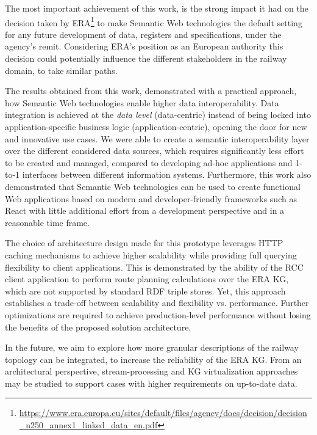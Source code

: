 The most important achievement of this work,
is the strong impact it had on the decision taken by ERA\footnote{\url{https://www.era.europa.eu/sites/default/files/agency/docs/decision/decision_n250_annex1_linked_data_en.pdf}} to
make Semantic Web technologies
the default setting for any future development of data,
registers and specifications, under the agency's remit.
Considering ERA's position as an European authority
this decision could potentially influence
the different stakeholders in the railway domain, to take similar paths.

The results obtained from this work,
demonstrated with a practical approach,
how Semantic Web technologies enable higher data interoperability.
Data integration is achieved at the \textit{data level} (data-centric)
instead of being locked into application-specific business logic (application-centric),
opening the door for new and innovative use cases.
We were able to create a semantic interoperability layer
over the different considered data sources,
which requires significantly less effort to be created and managed,
compared to developing ad-hoc applications
and 1-to-1 interfaces between different information systems.
Furthermore, this work also demonstrated
that Semantic Web technologies can be used to create
functional Web applications based on modern
and developer-friendly frameworks such as React
with little additional effort from a development perspective
and in a reasonable time frame.

The choice of architecture design made for this prototype
leverages HTTP caching mechanisms to achieve higher scalability
while providing full querying flexibility to client applications.
This is demonstrated by the ability of the RCC client application
to perform route planning calculations over the ERA KG,
which are not supported by standard RDF triple stores.
Yet, this approach establishes a trade-off
between scalability and flexibility vs. performance.
Further optimizations are required to achieve production-level performance
without losing the benefits of the proposed solution architecture.

In the future, we aim to explore how more granular descriptions
of the railway topology can be integrated, to increase the reliability of the ERA KG.
From an architectural perspective,
stream-processing and KG virtualization approaches may be studied
to support cases with higher requirements on up-to-date data.
